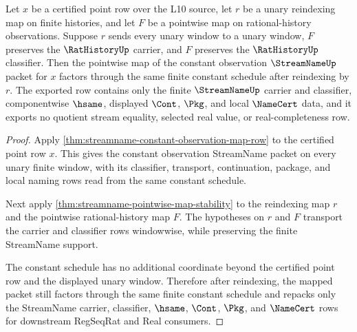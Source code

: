\begin{theorem}
\label{thm:streamname-constant-observation-map-composition}
Let $x$ be a certified point row over the L10 source, let $r$ be a unary reindexing map on finite histories, and let $F$ be a pointwise map on rational-history observations. Suppose $r$ sends every unary window to a unary window, $F$ preserves the $\RatHistoryUp$ carrier, and $F$ preserves the $\RatHistoryUp$ classifier. Then the pointwise map of the constant observation $\StreamNameUp$ packet for $x$ factors through the same finite constant schedule after reindexing by $r$. The exported row contains only the finite $\StreamNameUp$ carrier and classifier, componentwise $\hsame$, displayed $\Cont$, $\Pkg$, and local $\NameCert$ data, and it exports no quotient stream equality, selected real value, or real-completeness row.
\end{theorem}
\begin{proof}
Apply \autoref{thm:streamname-constant-observation-map-row} to the certified point row $x$. This gives the constant observation StreamName packet on every unary finite window, with its classifier, transport, continuation, package, and local naming rows read from the same constant schedule.

Next apply \autoref{thm:streamname-pointwise-map-stability} to the reindexing map $r$ and the pointwise rational-history map $F$. The hypotheses on $r$ and $F$ transport the carrier and classifier rows windowwise, while preserving the finite StreamName support.

The constant schedule has no additional coordinate beyond the certified point row and the displayed unary window. Therefore after reindexing, the mapped packet still factors through the same finite constant schedule and repacks only the StreamName carrier, classifier, $\hsame$, $\Cont$, $\Pkg$, and $\NameCert$ rows for downstream RegSeqRat and Real consumers.
\end{proof}
